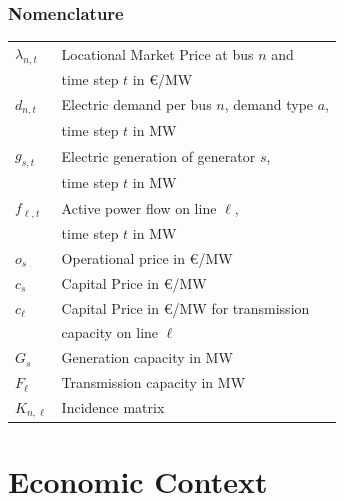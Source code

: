 \documentclass[11pt,twocolumn]{article}
\newcommand{\vpad}{\vspace{1mm}}
\newcommand{\generation}{g_{s,t}}
\newcommand{\capacityGeneration}{G_{s}}
\newcommand{\capacityFlow}{F_{\ell}}
\newcommand{\capexGeneration}{c_{s}}
\newcommand{\capexFlow}{c_{\ell}}
\newcommand{\opexGeneration}{o_{s}}
\newcommand{\demand}[1][n]{d_{#1,t}}
\newcommand{\incidence}[1][n]{K_{#1,\ell}}
\newcommand{\lmp}[1][n]{\lambda_{#1,t}}
\newcommand{\flow}{f_{\ell,t}}
\begin{document}
\subsubsection*{Nomenclature}

\begin{table}[h]
    \centering
    \begin{tabular}{ll}
        $\lmp$ & Locational Market Price at bus $n$ and  \\ & time step $t$ in \euro/MW \vpad \\
        $\demand$ & Electric demand per bus $n$, demand type $a$, \\ & time step $t$ in MW  \vpad \\
        $\generation$ & Electric generation of generator $s$, \\ & time step $t$  in MW \vpad \\
        $\flow$ & Active power flow on line $\ell$, \\ & time step $t$ in MW   \vpad \\
        $\opexGeneration$ & Operational price in \euro/MW \vpad \\
        $\capexGeneration$ & Capital Price in \euro/MW \vpad \\
        $\capexFlow$  & Capital Price in \euro/MW for transmission \\ & capacity on line $\ell$  \vpad \\
        $\capacityGeneration$ & Generation capacity in MW \vpad \\
        $\capacityFlow$ & Transmission capacity in MW \vpad \\
        $\incidence$ & Incidence matrix \vpad 
    \end{tabular}
\end{table}

\section{Economic Context}
\end{document}
